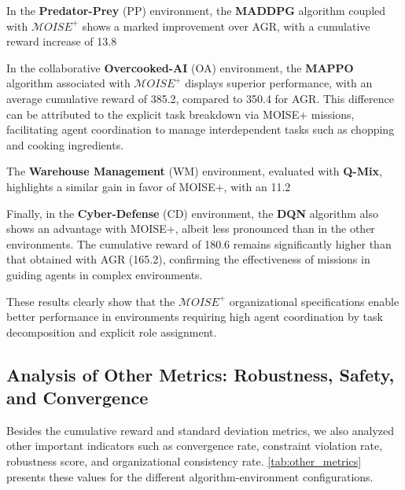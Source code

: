 \documentclass[sigconf,anonymous]{aamas}
\begin{document}
In the \textbf{Predator-Prey} (PP) environment, the \textbf{MADDPG} algorithm coupled with $\mathcal{M}OISE^+$ shows a marked improvement over AGR, with a cumulative reward increase of 13.8%

In the collaborative \textbf{Overcooked-AI} (OA) environment, the \textbf{MAPPO} algorithm associated with $\mathcal{M}OISE^+$ displays superior performance, with an average cumulative reward of 385.2, compared to 350.4 for AGR. This difference can be attributed to the explicit task breakdown via MOISE+ missions, facilitating agent coordination to manage interdependent tasks such as chopping and cooking ingredients.

The \textbf{Warehouse Management} (WM) environment, evaluated with \textbf{Q-Mix}, highlights a similar gain in favor of MOISE+, with an 11.2%

Finally, in the \textbf{Cyber-Defense} (CD) environment, the \textbf{DQN} algorithm also shows an advantage with MOISE+, albeit less pronounced than in the other environments. The cumulative reward of 180.6 remains significantly higher than that obtained with AGR (165.2), confirming the effectiveness of missions in guiding agents in complex environments.

These results clearly show that the $\mathcal{M}OISE^+$ organizational specifications enable better performance in environments requiring high agent coordination by task decomposition and explicit role assignment.

\subsection{Analysis of Other Metrics: Robustness, Safety, and Convergence}

Besides the cumulative reward and standard deviation metrics, we also analyzed other important indicators such as convergence rate, constraint violation rate, robustness score, and organizational consistency rate. \autoref{tab:other_metrics} presents these values for the different algorithm-environment configurations.
\end{document}
